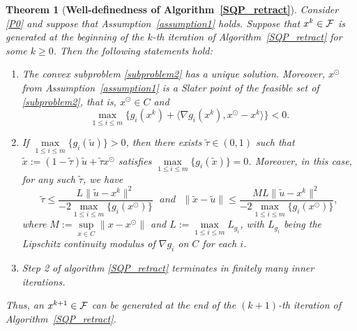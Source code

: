 \documentclass[10pt]{article}
\numberwithin{equation}{section}
\newtheorem{theorem}{Theorem}[section]
\def\xfeas{x^\odot}
\begin{document}
\begin{theorem}[{{\bf Well-definedness of Algorithm~\ref{SQP_retract}}}]\label{welldef1}
Consider \eqref{P0} and suppose that Assumption~\ref{assumption1} holds. Suppose that $x^k\in {\cal F}$ is {\color{blue} generated at the beginning of the $k$-th iteration} of Algorithm~\ref{SQP_retract} for some $k \ge 0$. Then the following statements hold:
\begin{enumerate}[{\rm (i)}]
   \item The convex subproblem \eqref{subproblem2} has a unique solution. Moreover, $\xfeas$ from Assumption~\ref{assumption1} is a Slater point of the feasible set of \eqref{subproblem2}, that is, $\xfeas\in C$ and $$\max\limits_{1 \le i \le m}\{g_i(x^k) + \langle \nabla g_i(x^k), \xfeas - x^k\rangle\} < 0.$$
   \item If $\max\limits_{1 \le i \le m} \{g_i(\widetilde{u})\} > 0$, then there exists $\widetilde{\tau}\in (0, 1)$ such that $\widetilde{x}:=(1 - \widetilde{\tau})\widetilde{u} + \widetilde{\tau} \xfeas$ satisfies $\max\limits_{1 \le i \le m} \{g_i(\widetilde{x})\} = 0$. Moreover, in this case, for any such $\widetilde\tau$, we have
       \begin{equation}\label{taubound0}
       \widetilde{\tau} \leq \frac{L\|\widetilde{u} - x^k\|^2}{-2\max\limits_{1 \le i \le m}\{g_i(\xfeas)\}}\ \ \ {and}\ \ \
       \|\widetilde{x} - \widetilde{u}\| \leq \frac{ML\|\widetilde{u} - x^k\|^2}{-2\max\limits_{1 \le i \le m}\{g_i(\xfeas)\}},
       \end{equation}
       where $M := \sup\limits_{x\in C}\|x - \xfeas\|$ and $L := \max\limits_{1 \le i \le m} L_{g_i}$, with $L_{g_i}$ being the Lipschitz continuity modulus of $\nabla g_i$ on $C$ for each $i$.
   \item Step 2 of algorithm \ref{SQP_retract} terminates in finitely many inner iterations.
 \end{enumerate}
 Thus, an $x^{k+1}\in {\cal F}$ can be generated at the end of the $(k+1)$-th iteration of Algorithm~\ref{SQP_retract}.
\end{theorem}
\end{document}
